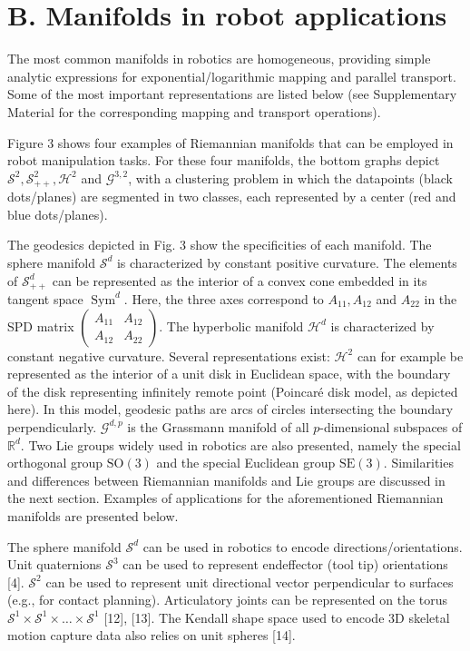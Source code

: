 \documentclass[10pt]{article}
\begin{document}
\section{B. Manifolds in robot applications}
The most common manifolds in robotics are homogeneous, providing simple analytic expressions for exponential/logarithmic mapping and parallel transport. Some of the most important representations are listed below (see Supplementary Material for the corresponding mapping and transport operations).

Figure 3 shows four examples of Riemannian manifolds that can be employed in robot manipulation tasks. For these four manifolds, the bottom graphs depict $\mathcal{S}^{2}, \mathcal{S}_{++}^{2}, \mathcal{H}^{2}$ and $\mathcal{G}^{3,2}$, with a clustering problem in which the datapoints (black dots/planes) are segmented in two classes, each represented by a center (red and blue dots/planes).

The geodesics depicted in Fig. 3 show the specificities of each manifold. The sphere manifold $\mathcal{S}^{d}$ is characterized by constant positive curvature. The elements of $\mathcal{S}_{++}^{d}$ can be represented as the interior of a convex cone embedded in its tangent space $\operatorname{Sym}^{d}$. Here, the three axes correspond to $A_{11}, A_{12}$ and $A_{22}$ in the SPD matrix $\left(\begin{array}{ll}A_{11} & A_{12} \\ A_{12} & A_{22}\end{array}\right)$. The hyperbolic manifold $\mathcal{H}^{d}$ is characterized by constant negative curvature. Several representations exist: $\mathcal{H}^{2}$ can for example be represented as the interior of a unit disk in Euclidean space, with the boundary of the disk representing infinitely remote point (Poincaré disk model, as depicted here). In this model, geodesic paths are arcs of circles intersecting the boundary perpendicularly. $\mathcal{G}^{d, p}$ is the Grassmann manifold of all $p$-dimensional subspaces of $\mathbb{R}^{d}$. Two Lie groups widely used in robotics are also presented, namely the special orthogonal group $\mathrm{SO}(3)$ and the special Euclidean group $\mathrm{SE}(3)$. Similarities and differences between Riemannian manifolds and Lie groups are discussed in the next section. Examples of applications for the aforementioned Riemannian manifolds are presented below.

The sphere manifold $\mathcal{S}^{d}$ can be used in robotics to encode directions/orientations. Unit quaternions $\mathcal{S}^{3}$ can be used to represent endeffector (tool tip) orientations [4]. $\mathcal{S}^{2}$ can be used to represent unit directional vector perpendicular to surfaces (e.g., for contact planning). Articulatory joints can be represented on the torus $\mathcal{S}^{1} \times \mathcal{S}^{1} \times \ldots \times \mathcal{S}^{1}$ [12], [13]. The Kendall shape space used to encode 3D skeletal motion capture data also relies on unit spheres [14].
\end{document}

